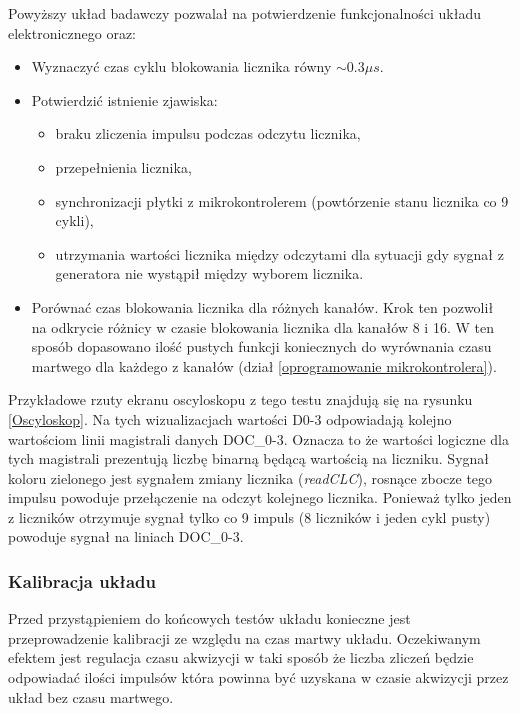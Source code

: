 Powyższy układ badawczy pozwalał na potwierdzenie funkcjonalności układu elektronicznego oraz:
\begin{itemize}
        \item Wyznaczyć czas cyklu blokowania licznika równy $\sim 0.3\mu s$.
        \item Potwierdzić istnienie zjawiska:
        \begin{itemize}
                \item braku zliczenia impulsu podczas odczytu licznika,
                \item przepełnienia licznika,
                \item synchronizacji płytki z mikrokontrolerem (powtórzenie stanu licznika co 9 cykli), 
                \item utrzymania wartości licznika między odczytami dla sytuacji gdy sygnał z generatora nie wystąpił między wyborem licznika.
        \end{itemize}  
        \item Porównać czas blokowania licznika dla różnych kanałów. Krok ten pozwolił na odkrycie różnicy w czasie blokowania licznika dla kanałów 8 i 16. W ten sposób dopasowano ilość pustych funkcji koniecznych do wyrównania czasu martwego dla każdego z kanałów (dział \ref{oprogramowanie mikrokontrolera}).
\end{itemize} 

Przykładowe rzuty ekranu oscyloskopu z tego testu znajdują się na rysunku \ref{Oscyloskop}. Na tych wizualizacjach wartości D0-3 odpowiadają kolejno wartościom linii magistrali danych DOC\_0-3. Oznacza to że wartości logiczne dla tych magistrali prezentują liczbę binarną będącą wartością na liczniku. Sygnał koloru zielonego jest sygnałem zmiany licznika (\textit{readCLC}), rosnące zbocze tego impulsu powoduje przełączenie na odczyt kolejnego licznika. Ponieważ tylko jeden z liczników otrzymuje sygnał tylko co 9 impuls (8 liczników i jeden cykl pusty) powoduje sygnał na liniach DOC\_0-3.

\subsubsection{Kalibracja układu}
\label{section kaliblracja}

Przed przystąpieniem do końcowych testów układu konieczne jest przeprowadzenie kalibracji ze względu na czas martwy układu. 
Oczekiwanym efektem jest regulacja czasu akwizycji w taki sposób że liczba zliczeń będzie odpowiadać ilości impulsów która powinna być uzyskana w czasie akwizycji przez układ bez czasu martwego. 

